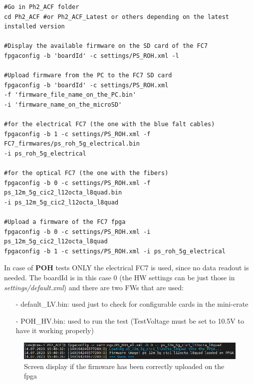 \documentclass[10pt,a4paper]{article}
\begin{document}
\begin{framed}
\begin{verbatim}
#Go in Ph2_ACF folder
cd Ph2_ACF #or Ph2_ACF_Latest or others depending on the latest installed version

#Display the available firmware on the SD card of the FC7
fpgaconfig -b 'boardId' -c settings/PS_ROH.xml -l

#Upload firmware from the PC to the FC7 SD card
fpgaconfig -b 'boardId' -c settings/PS_ROH.xml 
-f 'firmware_file_name_on_the_PC.bin' 
-i 'firmware_name_on_the_microSD'

#for the electrical FC7 (the one with the blue falt cables)
fpgaconfig -b 1 -c settings/PS_ROH.xml -f FC7_firmwares/ps_roh_5g_electrical.bin 
-i ps_roh_5g_electrical

#for the optical FC7 (the one with the fibers)
fpgaconfig -b 0 -c settings/PS_ROH.xml -f ps_12m_5g_cic2_l12octa_l8quad.bin 
-i ps_12m_5g_cic2_l12octa_l8quad

#Upload a firmware of the FC7 fpga
fpgaconfig -b 0 -c settings/PS_ROH.xml -i  ps_12m_5g_cic2_l12octa_l8quad
fpgaconfig -b 1 -c settings/PS_ROH.xml -i ps_roh_5g_electrical
\end{verbatim}
\end{framed}

In case of {\bf POH} tests ONLY the electrical FC7 is used, since no data readout is needed. The boardId is in this case 0 (the HW settings can be just those in {\it settings/default.xml}) and there are two FWs that are used:
\begin{itemize}
\item[-] default\_LV.bin: used just to check for configurable cards in the mini-crate
\item[-] POH\_HV.bin: used to run the test (TestVoltage must be set to 10.5V to have it working properly)
\end{itemize}
 

\begin{figure}[h!]
\centering
 \includegraphics[width=\linewidth]{firmware-writing.png} 
  \caption{Screen display if the firmware has been correctly uploaded on the fpga}
\end{figure}
\end{document}
